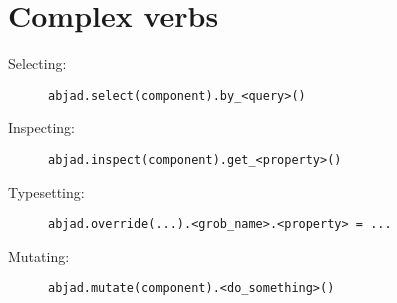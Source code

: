 \documentclass[a4paper]{tufte-handout}
\begin{document}
\section{Complex verbs}

\begin{description}
    \item[Selecting:]
        \hfill \verb|abjad.select(component).by_<query>()|
    \item[Inspecting:]
        \hfill \verb|abjad.inspect(component).get_<property>()|
    \item[Typesetting:]
        \hfill \verb|abjad.override(...).<grob_name>.<property> = ...|
    \item[Mutating:]
        \hfill \verb|abjad.mutate(component).<do_something>()|
\end{description}
\end{document}
